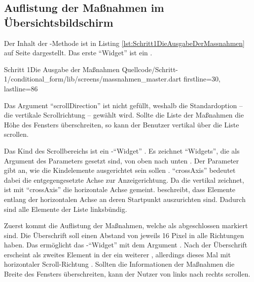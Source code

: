 \subsection{Auflistung der Maßnahmen im Übersichtsbildschirm}

Der Inhalt der -Methode ist in Listing \ref{lst:Schritt1DieAusgabeDerMassnahmen} auf Seite \pageref{lst:Schritt1DieAusgabeDerMassnahmen} dargestellt.
Das erste \enquote{Widget} ist ein  .
\begin{alexlisting}{Schritt 1}{Die Ausgabe der Maßnahmen}
  {Quellcode/Schritt-1/conditional_form/lib/screens/massnahmen_master.dart}
  {firstline=30, lastline=86}
  \label{lst:Schritt1DieAusgabeDerMassnahmen}
\end{alexlisting}

Das Argument \enquote{scrollDirection} ist nicht gefüllt, weshalb die Standardoption -- die vertikale Scrollrichtung -- gewählt wird.
Sollte die Liste der Maßnahmen die Höhe des Fensters überschreiten, so kann der Benutzer vertikal über die Liste scrollen.



Das Kind des Scrollbereichs ist ein -\enquote{Widget} .
Es zeichnet \enquote{Widgets}, die als Argument des Parameters  gesetzt sind, von oben nach unten .
Der Parameter  gibt an, wie die Kindelemente ausgerichtet sein sollen .
\enquote{crossAxis} bedeutet dabei die entgegengesetzte Achse zur Anzeigerichtung.
Da die  vertikal zeichnet, ist mit \enquote{crossAxis} die horizontale Achse gemeint.
 beschreibt, dass Elemente entlang der horizontalen Achse an deren Startpunkt auszurichten sind. Dadurch sind alle Elemente der Liste linksbündig.

Zuerst kommt die Auflistung der Maßnahmen, welche als abgeschlossen markiert sind.
Die Überschrift   soll einen Abstand von jeweils 16 Pixel in alle Richtungen haben.
Das ermöglicht das -\enquote{Widget}   mit dem Argument .
Nach der Überschrift erscheint als zweites Element in der  ein weiterer  ,
allerdings dieses Mal mit horizontaler Scroll-Richtung .
Sollten die Informationen der Maßnahmen die Breite des Fensters überschreiten, kann der Nutzer von links nach rechts scrollen.

